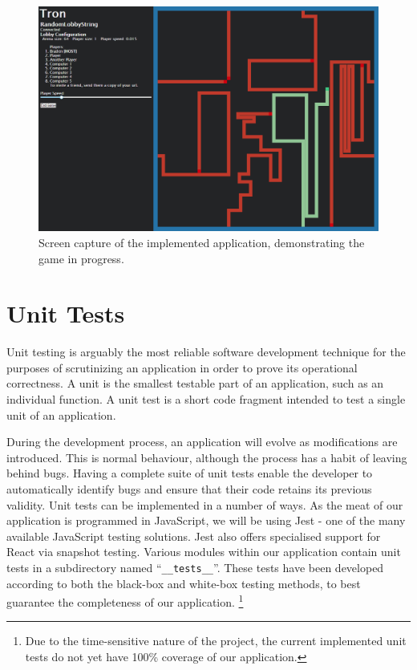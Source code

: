 \documentclass{standalone}
\begin{document}
	\begin{figure}[!htbp]
		\centering
		\includegraphics[width=\textwidth]{resources/images/ingame.png}
		\caption{Screen capture of the implemented application, demonstrating the game in progress.}
	\end{figure}
	\FloatBarrier

	\section{Unit Tests}
		Unit testing is arguably the most reliable software development technique for the purposes of scrutinizing an application in order to prove its operational correctness. A unit is the smallest testable part of an application, such as an individual function. A unit test is a short code fragment intended to test a single unit of an application.

		During the development process, an application will evolve as modifications are introduced. This is normal behaviour, although the process has a habit of leaving behind bugs. Having a complete suite of unit tests enable the developer to automatically identify bugs and ensure that their code retains its previous validity. Unit tests can be implemented in a number of ways. As the meat of our application is programmed in JavaScript, we will be using Jest \parencite{jest} - one of the many available JavaScript testing solutions. Jest also offers specialised support for React via snapshot testing. Various modules within our application contain unit tests in a subdirectory named \enquote{\texttt{\_\_tests\_\_}}. These tests have been developed according to both the black-box and white-box testing methods, to best guarantee the completeness of our application. \footnote{Due to the time-sensitive nature of the project, the current implemented unit tests do not yet have 100\% coverage of our application.}
\end{document}
